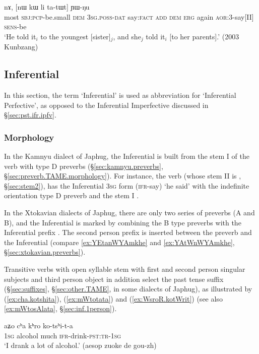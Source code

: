 \begin{exe}
\ex \label{ex:ti.nA.tatWt}
 nɤ, [nɯ kɯ li ta-tɯt] ɲɯ-ŋu \\
most \textsc{sbj}:\textsc{pcp}-be.small \textsc{dem} \textsc{3sg}.\textsc{poss}-\textsc{dat} say:\textsc{fact} \textsc{add} \textsc{dem} \textsc{erg} again \textsc{aor}:3\flobv{}-say[II] \textsc{sens}-be \\
\glt `He told it$_i$ to the youngest [sister]$_j$, and she$_j$ told it$_i$ [to her parents].' (2003 Kunbzang)
\end{exe}
 
\subsection{Inferential} \label{sec:ifr}
In this section, the term `Inferential' is used as abbreviation for `Inferential Perfective', as opposed to the Inferential Imperfective discussed in §\ref{sec:pst.ifr.ipfv}.

\subsubsection{Morphology}   \label{sec:ifr.morphology}
In the Kamnyu dialect of Japhug, the Inferential is built from the stem I of the verb with type D preverbs (§\ref{sec:kamnyu.preverbs}, §\ref{sec:preverb.TAME.morphology}). For instance, the verb  (whose stem II is , §\ref{sec:stem2}), has the Inferential \textsc{3sg} form  (\textsc{ifr}-say) `he said' with the indefinite orientation type D preverb  and the stem I .

In the Xtokavian dialects of Japhug, there are only two series of preverbs (A and B), and the Inferential is marked by combining the B type preverbs with the Inferential prefix . The second person prefix  is inserted between the preverb and the Inferential  (compare \ref{ex:YEtanWYAmkhe} and \ref{ex:YAtWnWYAmkhe}, §\ref{sec:xtokavian.preverbs}).

Transitive verbs with open syllable stem with first  and second person singular subjects and third person object in addition select the  past tense suffix (§\ref{sec:suffixes}, §\ref{sec:other.TAME},  in some dialects of Japhug), as illustrated by (\ref{ex:cha.kotshita}), (\ref{ex:mWtotata}) and (\ref{ex:WsroR.kotWrit}) (see also \ref{ex:mWtosAlata}, §\ref{sec:inf.1person}).

\begin{exe}
\ex \label{ex:cha.kotshita}
\gll aʑo cʰa kʰro ko-tsʰi-t-a \\
\textsc{1sg} alcohol much \textsc{ifr}-drink-\textsc{pst}:\textsc{tr}-\textsc{1sg} \\
\glt `I drank a lot of alcohol.' (aesop zuoke de gou-zh)
\end{exe}

